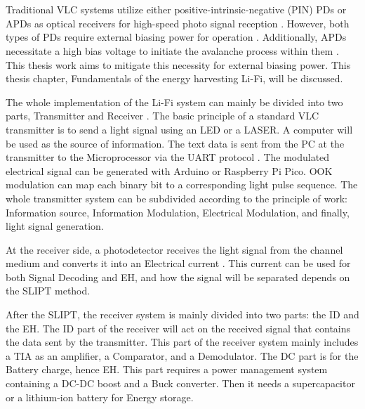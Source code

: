 \chapter{}


Traditional \ac{VLC} systems utilize either positive-intrinsic-negative (PIN) \ac{PD}s or \ac{APDs} as optical receivers for high-speed photo signal reception \cite{liu2016visible}. However, both types of \ac{PD}s require external biasing power for operation \cite{wang2015design} \cite{liu2016visible}. Additionally, \ac{APDs} necessitate a high bias voltage to initiate the avalanche process within them \cite{liu2016visible}. This thesis work aims to mitigate this necessity for external biasing power. This thesis chapter, Fundamentals of the energy harvesting \ac{Li-Fi}, will be discussed.


The whole implementation of the \ac{Li-Fi} system can mainly be divided into two parts, Transmitter and Receiver \cite{mahmoud2022design}. The basic principle of a standard \ac{VLC} transmitter is to send a light signal using an LED or a LASER. A computer will be used as the source of information. The text data is sent from the PC at the transmitter to the Microprocessor via the \ac{UART} protocol \cite{mahmoud2022design}. The modulated electrical signal can be generated with Arduino or Raspberry Pi Pico. \ac{OOK} modulation can map each binary bit to a corresponding light pulse sequence. The whole transmitter system can be subdivided according to the principle of work: Information source, Information Modulation, Electrical Modulation, and finally, light signal generation.

At the receiver side, a photodetector receives the light signal from the channel medium and converts it into an Electrical current \cite{fuada2018noise}. This current can be used for both Signal Decoding and \ac{EH}, and how the signal will be separated depends on the \ac{SLIPT} method. 

After the \ac{SLIPT}, the receiver system is mainly divided into two parts: the \ac{ID} and the \ac{EH}. The \ac{ID} part of the receiver will act on the received signal that contains the data sent by the transmitter. This part of the receiver system mainly includes a \ac{TIA} as an amplifier, a Comparator, and a Demodulator. The DC part is for the Battery charge, hence \ac{EH}. This part requires a power management system containing a DC-DC boost and a Buck converter. Then it needs a supercapacitor or a lithium-ion battery for Energy storage.

